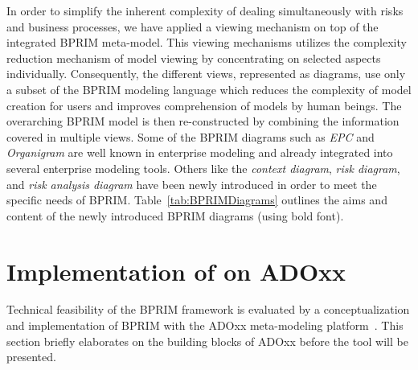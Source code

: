 \documentclass[preprint,3p,times,number]{elsarticle}
\begin{document}
In order to simplify the inherent complexity of dealing simultaneously with risks and business processes, we have applied a viewing mechanism on top of the integrated BPRIM meta-model. This viewing mechanisms utilizes the complexity reduction mechanism of model viewing by concentrating on selected aspects individually. Consequently, the different views, represented as diagrams, use only a subset of the BPRIM modeling language which reduces the complexity of model creation for users and improves comprehension of models by human beings. The overarching BPRIM model is then re-constructed by combining the information covered in multiple views. Some of the BPRIM diagrams such as \emph{EPC} and \emph{Organigram} are well known in enterprise modeling and already integrated into several enterprise modeling tools. Others like the \emph{context diagram}, \emph{risk diagram}, and \emph{risk analysis diagram} have been newly introduced in order to meet the specific needs of BPRIM. Table~\ref{tab:BPRIMDiagrams} outlines the aims and content of the newly introduced BPRIM diagrams (using bold font).

\section{Implementation of \adobprim{} on ADOxx}
\label{sec:adobprim}
Technical feasibility of the BPRIM framework is evaluated by a conceptualization and implementation of BPRIM with the ADOxx meta-modeling platform~\cite{ADOxx}. This section briefly elaborates on the building blocks of ADOxx before the \adobprim{} tool will be presented.
\end{document}
